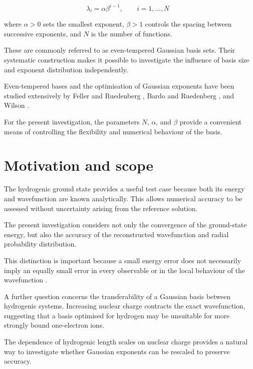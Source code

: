 \begin{equation}
    \lambda_i=\alpha\beta^{i-1},
    \qquad i=1,\ldots,N
    \label{eq:intro_even_tempered}
\end{equation}

where \(\alpha>0\) sets the smallest exponent,
\(\beta>1\) controls the spacing between successive
exponents, and \(N\) is the number of functions.

These are commonly referred to as even-tempered
Gaussian basis sets. Their systematic construction
makes it possible to investigate the influence of
basis size and exponent distribution independently.

Even-tempered bases and the optimisation of Gaussian
exponents have been studied extensively by Feller
and Ruedenberg \cite{FellerRuedenberg1979},
Bardo and Ruedenberg \cite{BaR},
and Wilson \cite{Wilson}.

For the present investigation, the parameters
\(N\), \(\alpha\), and \(\beta\) provide a
convenient means of controlling the flexibility
and numerical behaviour of the basis.


\section{Motivation and scope}

The hydrogenic ground state provides a useful
test case because both its energy and wavefunction
are known analytically. This allows numerical
accuracy to be assessed without uncertainty
arising from the reference solution.

The present investigation considers not only
the convergence of the ground-state energy,
but also the accuracy of the reconstructed
wavefunction and radial probability distribution.

This distinction is important because a small
energy error does not necessarily imply an
equally small error in every observable or
in the local behaviour of the wavefunction
\cite{Kutzelnigg1994}.

A further question concerns the transferability
of a Gaussian basis between hydrogenic systems.
Increasing nuclear charge contracts the exact
wavefunction, suggesting that a basis optimised
for hydrogen may be unsuitable for more
strongly bound one-electron ions.

The dependence of hydrogenic length scales on
nuclear charge provides a natural way to
investigate whether Gaussian exponents can
be rescaled to preserve accuracy.


